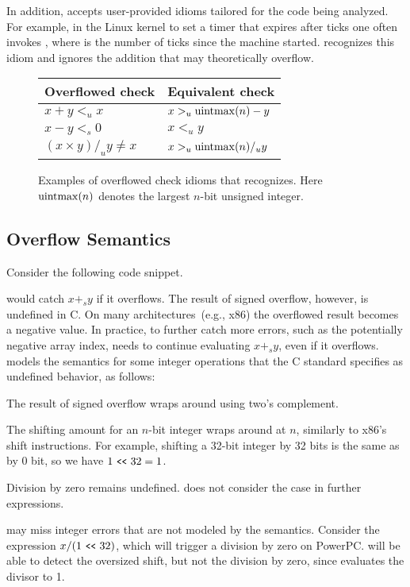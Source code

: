 In addition, \sys accepts user-provided idioms tailored for the
code being analyzed.  For example, in the Linux kernel to set a
timer that expires after  ticks one often invokes
, where  is the
number of ticks since the machine started.  \sys recognizes
this idiom and ignores the addition  that may
theoretically overflow.
\fi

\begin{figure}
\centering
\begin{tabular}{ll}
\toprule
Overflowed check & Equivalent check \\ \midrule
$x + y <_u x$ & $x >_u \operatorname{uintmax}(n) - y$ \\
$x - y <_s 0$ & $x <_u y$ \\
$(x \times y) /_u y \neq x$ & $x >_u \operatorname{uintmax}(n) /_u y$   \\
\bottomrule
\end{tabular}
\caption{Examples of overflowed check idioms that \sys recognizes.
Here $\operatorname{uintmax}(n)$ denotes the largest $n$-bit unsigned integer.}
\label{f:whitelist}
\end{figure}

\subsection{Overflow Semantics}
\label{s:sema:def}

Consider the following code snippet.


\sys would catch $x +_s y$ if it overflows. The result of signed overflow,
however, is undefined in C\@. On many architectures~(e.g., x86) the overflowed
result becomes a negative value. In practice, to further catch more errors,
such as the potentially negative array index, \sys needs to continue evaluating
$x +_s y$, even if it overflows.  \sys models the semantics for some integer
operations that the C standard specifies as undefined behavior, as follows:

\begin{CompactItemize}
\item
The result of signed overflow wraps around using two's complement.
\item
The shifting amount for an $n$-bit integer wraps around at $n$,
similarly to x86's shift instructions.  For example, shifting
a 32-bit integer by 32 bits is the same as by $0$ bit,
so we have $1 \shl 32 = 1$.
\end{CompactItemize}
Division by zero remains undefined.  \sys does not consider the case
in further expressions.

\sys may miss integer errors that are not modeled by the semantics.
Consider the expression $x / (1 \shl 32)$, which will trigger a
division by zero on PowerPC\@.  \sys will be able to detect the
oversized shift, but not the division by zero, since \sys evaluates
the divisor to 1.


